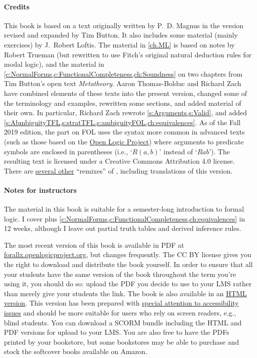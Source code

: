 \paragraph{Credits} This book is based on a text originally written by P.~D. Magnus in the version revised and expanded by Tim Button. It also includes some material (mainly exercises) by J.~Robert Loftis. The material in \cref{ch.ML} is based on notes by Robert Trueman (but rewritten to use Fitch's original natural deduction rules for modal logic), and the material in \cref{c:NormalForms,c:FunctionalCompleteness,ch:Soundness} on two chapters from Tim Button's open text \textit{Metatheory}. Aaron Thomas-Bolduc and Richard Zach have combined elements of these texts into the present version, changed some of the terminology and examples, rewritten some sections, and added material of their own.  In particular, Richard Zach rewrote \cref{s:Arguments,s:Valid}, and added \cref{s:AbmbiguityTFL,s:stratTFL,s:ambiguityFOL,ch:equivalences}. As of the Fall 2019 edition, the part on FOL uses the syntax more common in advanced texts (such as those based on the \href{https://openlogicproject.org/}{Open Logic Project}) where arguments to predicate symbols are enclosed in parentheses (i.e., `$R(a,b)$' instead of `$Rab$'). The resulting text is licensed under a Creative Commons Attribution 4.0 license. There are \href{https://github.com/OpenLogicProject/OpenLogic/wiki/Other-Logic-Textbooks}{several other} ``remixes'' of \forallx, including translations of this version.

\paragraph{Notes for instructors} The material in this book is suitable for a semester-long introduction to formal logic. I cover  plus \cref{c:NormalForms,c:FunctionalCompleteness,ch:equivalences} in 12 weeks, although I leave out partial truth tables and derived inference rules.

The most recent version of this book is available in PDF at
\href{https://forallx.openlogicproject.org}{forallx.openlogicproject.org},
but changes frequently.  The CC BY license gives you the right to
download and distribute the book yourself. In order to ensure that all
your students have the same version of the book throughout the term
you're using it, you should do so: upload the PDF you decide to use to
your LMS rather than merely give your students the link. The book is
also available in an
\href{https://forallx.openlogicproject.org/html/}{HTML version}. This
version has been prepared with
\href{https://forallx.openlogicproject.org/html/A4.html}{special
attention to accessibility issues} and should be more suitable for
users who rely on screen readers, e.g., blind students. You can
download a SCORM bundle including the HTML and PDF versions for upload
to your LMS. You are also free to have the PDFs printed by your
bookstore, but some bookstores may be able to purchase and stock the
softcover books available on Amazon.


